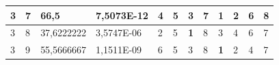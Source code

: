 \documentclass[conference]{IEEEtran}
\begin{document}
\begin{table}[]
\begin{tabular}{|llll|llllllll|}
\multicolumn{1}{|l|}{3}                                                     & \multicolumn{1}{l|}{7}                                                        & \multicolumn{1}{l|}{66,5}                                                         & 7,5073E-12                     & \multicolumn{1}{l|}{4}                                                  & \multicolumn{1}{l|}{5}                                                  & \multicolumn{1}{l|}{3}                                                  & \multicolumn{1}{l|}{7}                                                  & \multicolumn{1}{l|}{\textbf{1}}                                         & \multicolumn{1}{l|}{2}                                                  & \multicolumn{1}{l|}{6}                                                  & 8                          \\ \hline
\multicolumn{1}{|l|}{3}                                                     & \multicolumn{1}{l|}{8}                                                        & \multicolumn{1}{l|}{37,6222222}                                                   & 3,5747E-06                     & \multicolumn{1}{l|}{2}                                                  & \multicolumn{1}{l|}{5}                                                  & \multicolumn{1}{l|}{\textbf{1}}                                         & \multicolumn{1}{l|}{8}                                                  & \multicolumn{1}{l|}{3}                                                  & \multicolumn{1}{l|}{4}                                                  & \multicolumn{1}{l|}{6}                                                  & 7                          \\ \hline
\multicolumn{1}{|l|}{3}                                                     & \multicolumn{1}{l|}{9}                                                        & \multicolumn{1}{l|}{55,5666667}                                                   & 1,1511E-09                     & \multicolumn{1}{l|}{6}                                                  & \multicolumn{1}{l|}{5}                                                  & \multicolumn{1}{l|}{3}                                                  & \multicolumn{1}{l|}{8}                                                  & \multicolumn{1}{l|}{\textbf{1}}                                         & \multicolumn{1}{l|}{2}                                                  & \multicolumn{1}{l|}{4}                                                  & 7                          \\ \hline

\end{tabular}
\end{table}
\end{document}

